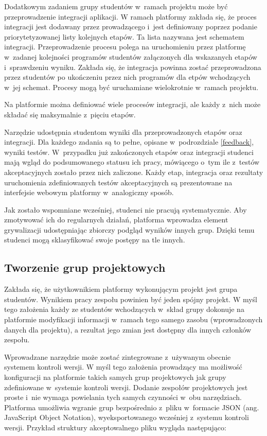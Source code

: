 Dodatkowym zadaniem grupy studentów w~ramach projektu może być przeprowadzenie integracji aplikacji.
W ramach platformy zakłada się, że proces integracji jest dodawany przez prowadzącego i~jest definiowany poprzez podanie priorytetyzowanej listy kolejnych etapów.
Ta lista nazywana jest schematem integracji.
Przeprowadzenie procesu polega na uruchomieniu przez platformę w~zadanej kolejności programów studentów załączonych dla wskazanych etapów i~sprawdzeniu wyniku.
Zakłada się, że integracja powinna zostać przeprowadzona przez studentów po ukończeniu przez nich programów dla etpów wchodzących w~jej schemat.
Procesy mogą być uruchamiane wielokrotnie w~ramach projektu.

Na platformie można definiować wiele procesów integracji, ale każdy z~nich może składać się maksymalnie z~pięciu etapów.

Narzędzie udostępnia studentom wyniki dla przeprowadzonych etapów oraz integracji.
Dla każdego zadania są to pełne, opisane w~podrozdziale \ref{feedback}, wyniki testów.
W~przypadku już zakończonych etapów oraz integracji studenci mają wgląd do podsumowanego statusu ich pracy, mówiącego o~tym ile z~testów akceptacyjnych zostało przez nich zaliczone.
Każdy etap, integracja oraz rezultaty uruchomienia zdefiniowanych testów akceptacyjnych są prezentowane na interfejsie webowym platformy w~analogiczny sposób.

Jak zostało wspomniane wcześniej, studenci nie pracują systematycznie.
Aby zmotywować ich do regularnych działań, platforma wprowadza element grywalizacji udostępniając zbiorczy podgląd wyników innych grup.
Dzięki temu studenci mogą sklasyfikować swoje postępy na tle innych.


\subsection{Tworzenie grup projektowych}
\label{adding_project_groups}

Zakłada się, że użytkownikiem platformy wykonującym projekt jest grupa studentów.
Wynikiem pracy zespołu powinien być jeden spójny projekt.
W myśl tego założenia każdy ze studentów wchodzących w~skład grupy dokonuje na platformie modyfikacji informacji w~ramach tego samego zasobu (wprowadzonych danych dla projektu), a rezultat jego zmian jest dostępny dla innych członków zespołu.

Wprowadzane narzędzie może zostać zintegrowane z~używanym obecnie systemem kontroli wersji.
W myśl tego założenia prowadzący ma możliwość konfiguracji na platformie takich samych grup projektowych jak grupy zdefiniowane w~systemie kontroli wersji.
Dodanie zespołów projektowych jest proste i~nie wymaga powielania tych samych czynności w~obu narzędziach.
Platforma umożliwia wgranie grup bezpośrednio z~pliku w~formacie JSON (ang. JavaScript Object Notation), wyeksportowanego wcześniej z~systemu kontroli wersji.
Przykład struktury akceptowalnego pliku wygląda następująco:

